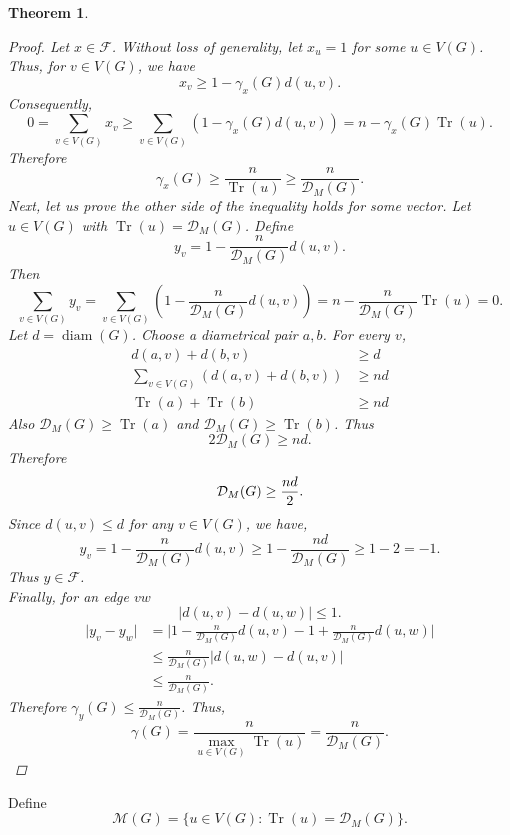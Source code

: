 \documentclass[12pt]{article}
\newtheorem{theorem}{Theorem}[section]
\DeclareMathOperator{\diam}{diam}
\DeclareMathOperator{\tr}{Tr}
\begin{document}
{{\begin{theorem}
				\begin{proof}
					Let $x \in \mathcal{F}$. Without loss of generality, let $x_u=1$ for some $u \in V(G)$. 
					Thus, for $v \in V(G)$, we have
					$$
					x_v \geq 1- \gamma_x(G) d(u,v).
					$$
					Consequently,
					$$
					0=\sum\limits_{v \in V(G)} x_v\geq \sum\limits_{v \in V(G)} (1- \gamma_x(G) d(u,v))=n- \gamma_x(G) \tr(u).
					$$
					Therefore
					$$
					\gamma_x(G) \geq \frac{n}{\tr(u)}\geq \frac{n}{\mathcal{D}_M(G)}.
					$$
					Next, let us prove the other side of the inequality holds for some vector. Let $u \in V(G)$ with $\tr(u)=\mathcal{D}_M(G)$. Define
					$$
					y_v=1 - \frac{n}{\mathcal{D}_M(G)}d(u,v).
					$$
					Then
					$$
					\sum\limits_{v\in V(G)}y_v=\sum\limits_{v\in V(G)}\left(1 - \frac{n}{\mathcal{D}_M(G)}d(u,v)\right)=n-\frac{n}{\mathcal{D}_M(G)}\tr(u)=0.
					$$
					Let $d=\diam(G)$. Choose a diametrical pair $a,b$. For every $v$,
					\begin{align*}
						d(a,v)+d(b,v) &\geq d\\
						\sum\limits_{v \in V(G)}(d(a,v)+d(b,v))&\geq nd\\
						\tr(a)+\tr(b) &\geq nd
					\end{align*}
					Also $\mathcal{D}_M(G) \geq \tr(a)$ and $\mathcal{D}_M(G) \geq \tr(b)$. Thus
					$$
					2\mathcal{D}_M(G) \geq nd.
					$$
					Therefore 
					\begin{equation}
						\mathcal{D}_M(G) \geq \frac{nd}{2}.\notag
					\end{equation}
					Since $d(u,v) \leq d$ for any $v\in V(G)$, we have,
					$$
					y_v=1 - \frac{n}{\mathcal{D}_M(G)}d(u,v)\geq 1-\frac{nd}{\mathcal{D}_M(G)}\geq 1-2=-1.
					$$
					Thus $y \in \mathcal{F}$.\\
					Finally, for an edge $vw$
					$$
					\vert d(u,v) -d(u,w) \vert \leq 1.
					$$
					\begin{align*}
						\vert y_v -y_w\vert &=\vert 1 - \frac{n}{\mathcal{D}_M(G)}d(u,v)-1+\frac{n}{\mathcal{D}_M(G)}d(u,w)\vert\\
						&\leq \frac{n}{\mathcal{D}_M(G)}\vert d(u,w) -d(u,v) \vert \\
						& \leq\frac{n}{\mathcal{D}_M(G)}.
					\end{align*}
					Therefore $ \gamma_y(G) \leq \frac{n}{\mathcal{D}_M(G)}$. Thus, $$\gamma(G)=\frac{n}{\max\limits_{u \in V(G)}  \tr(u)}=\frac{n}{\mathcal{D}_M(G)}.$$
				\end{proof}
			\end{theorem}
			Define
			$$
			\mathcal{M}(G)=\biggl\{u \in V(G): \tr(u)=\mathcal{D}_M(G)\biggl\}.
$$}}
\end{document}
